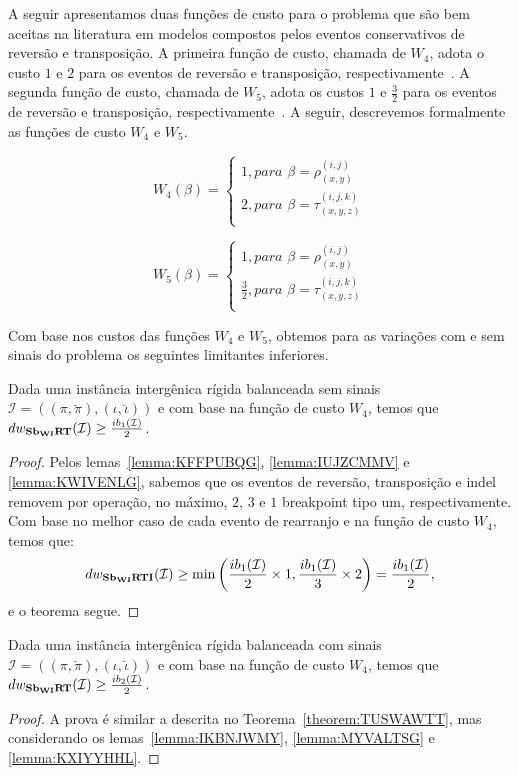 A seguir apresentamos duas funções de custo para o problema \SbWIRT{} que são bem aceitas na literatura em modelos compostos pelos eventos conservativos de reversão e transposição. A primeira função de custo, chamada de $W_4$, adota o custo $1$ e $2$ para os eventos de reversão e transposição, respectivamente~\cite{2002-eriksen}. A segunda função de custo, chamada de $W_5$, adota os custos $1$ e $\frac{3}{2}$ para os eventos de reversão e transposição, respectivamente~\cite{2019a-oliveira-etal}. A seguir, descrevemos formalmente as funções de custo $W_4$ e $W_5$.

$$
  W_4(\beta) = \begin{cases}
      1, \textit{para } \beta = \rho_{(x,y)}^{(i,j)} \\
      2, \textit{para } \beta = \tau_{(x,y,z)}^{(i,j,k)} \\
  \end{cases}
$$ 

$$
  W_5(\beta) = \begin{cases}
      1, \textit{para } \beta = \rho_{(x,y)}^{(i,j)} \\
      \frac{3}{2}, \textit{para } \beta = \tau_{(x,y,z)}^{(i,j,k)} \\
  \end{cases}
$$

Com base nos custos das funções $W_4$ e $W_5$, obtemos para as variações com e sem sinais do problema \SbWIRT{} os seguintes limitantes inferiores.

\begin{theorem}\label{theorem:TUSWAWTT}
Dada uma instância intergênica rígida balanceada sem sinais $\mathcal{I}=((\pi,\breve\pi),(\iota,\breve\iota))$ e com base na função de custo $W_4$, temos que $dw_{\textbf{Sb\textsubscript{WI}RT}}(\mathcal{I}) \ge \frac{ib_1(\mathcal{I})}{2}$.
\begin{proof}
Pelos lemas~\ref{lemma:KFFPUBQG}, \ref{lemma:IUJZCMMV} e \ref{lemma:KWIVENLG}, sabemos que os eventos de reversão, transposição e indel removem por operação, no máximo, $2$, $3$ e $1$ breakpoint tipo um, respectivamente. Com base no melhor caso de cada evento de rearranjo e na função de custo $W_4$, temos que:
$$dw_{\textbf{Sb\textsubscript{WI}RTI}}(\mathcal{I}) \ge \min\left(\frac{ib_1(\mathcal{I})}{2} \times 1,\frac{ib_1(\mathcal{I})}{3} \times 2\right) = \frac{ib_1(\mathcal{I})}{2},$$ e o teorema segue.
\end{proof}
\end{theorem}

\begin{theorem}\label{theorem:RPTOVHAP}
Dada uma instância intergênica rígida balanceada com sinais $\mathcal{I}=((\pi,\breve\pi),(\iota,\breve\iota))$ e com base na função de custo $W_4$, temos que $dw_{\textbf{Sb\textsubscript{WI}RT}}(\mathcal{I}) \ge \frac{ib_2(\mathcal{I})}{2}$.
\begin{proof}
A prova é similar a descrita no Teorema~\ref{theorem:TUSWAWTT}, mas considerando os lemas~\ref{lemma:IKBNJWMY}, \ref{lemma:MYVALTSG} e \ref{lemma:KXIYYHHL}.
\end{proof}
\end{theorem}

